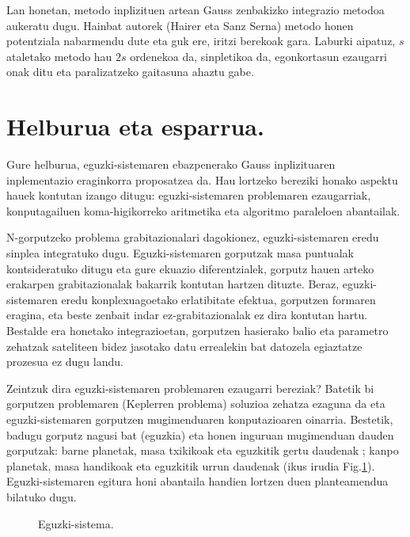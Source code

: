 Lan honetan, metodo inplizituen artean Gauss zenbakizko integrazio metodoa aukeratu dugu. Hainbat autorek (Hairer \cite{Hairer2006}\cite{Hairer2008} eta Sanz Serna\cite{JMSanz-Serna1994}) metodo honen potentziala nabarmendu dute eta guk ere, iritzi berekoak gara. Laburki aipatuz, $s$ ataletako metodo hau $2s$ ordenekoa da, sinpletikoa da, egonkortasun ezaugarri onak ditu eta paralizatzeko gaitasuna ahaztu gabe.      

\section{Helburua eta esparrua.}

Gure helburua, eguzki-sistemaren ebazpenerako Gauss inplizituaren inplementazio eraginkorra proposatzea da. Hau lortzeko  bereziki honako aspektu hauek kontutan izango ditugu: eguzki-sistemaren problemaren ezaugarriak, konputagailuen koma-higikorreko aritmetika eta algoritmo paraleloen abantailak.  

N-gorputzeko problema grabitazionalari dagokionez, eguzki-sistemaren eredu sinplea integratuko dugu. Eguzki-sistemaren gorputzak masa puntualak kontsideratuko ditugu eta gure ekuazio diferentzialek, gorputz hauen arteko erakarpen grabitazionalak bakarrik kontutan hartzen dituzte. Beraz, eguzki-sistemaren eredu konplexuagoetako erlatibitate efektua, gorputzen formaren eragina, eta beste zenbait indar ez-grabitazionalak ez dira kontutan hartu.
Bestalde era honetako integrazioetan, gorputzen hasierako balio eta parametro zehatzak sateliteen bidez jasotako datu errealekin bat datozela egiaztatze prozesua ez dugu landu.

Zeintzuk dira eguzki-sistemaren problemaren ezaugarri bereziak? Batetik bi gorputzen problemaren (Keplerren problema) soluzioa zehatza ezaguna da eta eguzki-sistemaren gorputzen mugimenduaren konputazioaren oinarria. Bestetik,  badugu gorputz nagusi bat (eguzkia) eta honen inguruan mugimenduan dauden gorputzak: barne planetak, masa txikikoak eta eguzkitik gertu daudenak ; kanpo planetak, masa handikoak eta eguzkitik urrun daudenak (ikus irudia Fig.\ref{fig:plot1}). Eguzki-sistemaren egitura honi abantaila handien lortzen duen planteamendua bilatuko dugu.


\begin{figure}[h]
\centering
{}
\caption[Eguzki-sistema]{\small Eguzki-sistema.}
\label{fig:plot1}
\end{figure}    
   

